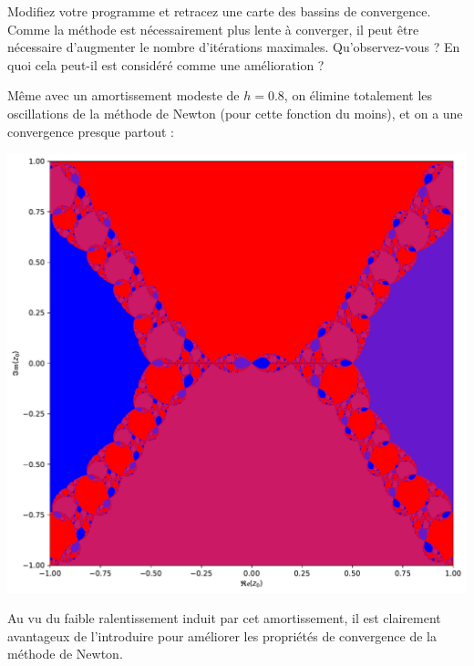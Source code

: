 \documentclass{book}
\begin{document}
Modifiez votre programme et retracez une carte des bassins de convergence. Comme la méthode est nécessairement plus lente à converger, il peut être nécessaire d'augmenter le nombre d'itérations maximales. Qu'observez-vous ? En quoi cela peut-il est considéré comme une amélioration ?

\begin{correction}
Même avec un amortissement modeste de $h=0.8$, on élimine totalement les oscillations de la méthode de Newton (pour cette fonction du moins), et on a une convergence presque partout :
\begin{center}
\includegraphics[width=0.7\linewidth]{TD2/newton_bassins_converg_z4_2z2_1.h08.pdf}
\end{center}
Au vu du faible ralentissement induit par cet amortissement, il est clairement avantageux de l'introduire pour améliorer les propriétés de convergence de la méthode de Newton.\\


\end{correction}
\end{document}
